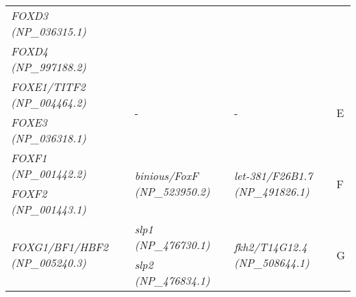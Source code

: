 \documentclass[../main.tex]{subfiles}
\begin{document}
\begin{longtable}{llll}
	\textit{FOXD3 (NP\_036315.1)}                           &                                                                                                        &                                                                                                    &                       \\
	\textit{FOXD4 (NP\_997188.2)}                           &                                                                                                        &                                                                                                    &                       \\ [0.2cm]
	\textit{FOXE1/TITF2 (NP\_004464.2)}                     & \multirow{2}{*}{-}                                                                                     & \multirow{2}{*}{-}                                                                                 & \multirow{2}{*}{E}    \\
	\textit{FOXE3 (NP\_036318.1)}                           &                                                                                                        &                                                                                                    &                       \\ [0.2cm]
	\textit{FOXF1 (NP\_001442.2)}                           & \multirow{2}{*}{\textit{binious/FoxF (NP\_523950.2)}}                                                  & \multirow{2}{*}{\textit{let-381/F26B1.7 (NP\_491826.1)}}                                           & \multirow{2}{*}{F}    \\
	\textit{FOXF2 (NP\_001443.1)}                           &                                                                                                        &                                                                                                    &                       \\ [0.2cm]
	\multirow{3}{*}{\textit{FOXG1/BF1/HBF2 (NP\_005240.3)}} & \textit{slp1 (NP\_476730.1)}                                                                           & \multirow{3}{*}{\textit{fkh2/T14G12.4 (NP\_508644.1)}}                                             & \multirow{3}{*}{G}    \\
	                                                        & \textit{slp2 (NP\_476834.1)}                                                                           &                                                                                                    &                       \\

\end{longtable}
\end{document}
